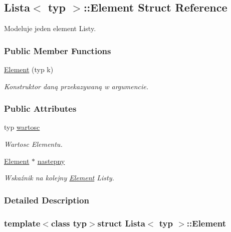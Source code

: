 \hypertarget{struct_lista_1_1_element}{\subsection{Lista$<$ typ $>$\-:\-:Element Struct Reference}
\label{struct_lista_1_1_element}
}


Modeluje jeden element Listy.  


\subsubsection*{Public Member Functions}
\begin{DoxyCompactItemize}
\item 
\hyperlink{struct_lista_1_1_element_a4923b6d714dd8380b6fd34d7520adfbd}{Element} (typ k)
\begin{DoxyCompactList}\small\item\em Konstruktor daną przekazywaną w argumencie. \end{DoxyCompactList}\end{DoxyCompactItemize}
\subsubsection*{Public Attributes}
\begin{DoxyCompactItemize}
\item 
typ \hyperlink{struct_lista_1_1_element_ad870a2e351c1c851c2728cf7f3a5fcd4}{wartosc}
\begin{DoxyCompactList}\small\item\em Wartosc Elementu. \end{DoxyCompactList}\item 
\hyperlink{struct_lista_1_1_element}{Element} $\ast$ \hyperlink{struct_lista_1_1_element_a61349dda2a4e08d63b757128e2ef208b}{nastepny}
\begin{DoxyCompactList}\small\item\em Wskaźnik na kolejny \hyperlink{struct_lista_1_1_element}{Element} Listy. \end{DoxyCompactList}\end{DoxyCompactItemize}


\subsubsection{Detailed Description}
\subsubsection*{template$<$class typ$>$struct Lista$<$ typ $>$\-::\-Element}

